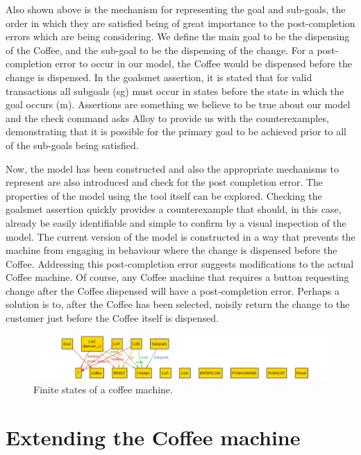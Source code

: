 \documentclass[a4paper,10pt]{report}
\begin{document}
Also shown above is the mechanism for representing the goal and sub-goals, the order in which they are satisfied being of great importance to the post-completion errors which are being considering. We define the main goal to be the dispensing of the Coffee, and the sub-goal to be the dispensing of the change. For a post-completion error to occur in our model, the Coffee would be dispensed before the change is dispensed. In the goalsmet assertion, it is stated that for valid transactions all subgoals (sg) must occur in states before the state in which the goal occurs (m). Assertions are something we believe to be true about our model and the check command asks Alloy to provide us with the counterexamples, demonstrating that it is possible for the primary goal to be achieved prior to all of the sub-goals being satisfied.

Now, the model has been constructed and also the appropriate mechanisms to represent are also introduced and check for the post completion error. The properties of the model using the tool itself can be explored. Checking the goalsmet assertion quickly provides a counterexample that should, in this case, already be easily identifiable and simple to confirm by a visual inspection of the model. The current version of the model is constructed in a way that prevents the machine from engaging in behaviour where the change is dispensed before the Coffee. Addressing this post-completion error suggests modifications to the actual Coffee machine. Of course, any Coffee machine that requires a button requesting change after the Coffee dispensed will have a post-completion error. Perhaps a solution is to, after the Coffee has been selected, noisily return the change to the customer just before the Coffee itself is dispensed.

\begin{figure}[h!]
 \centering
  \includegraphics[width= 1\textwidth]{viz1.png}
\caption{Finite states of a coffee machine.}
 \end{figure}
 
 \section{Extending the Coffee machine}
\label{Cofee machine ext}
\end{document}
